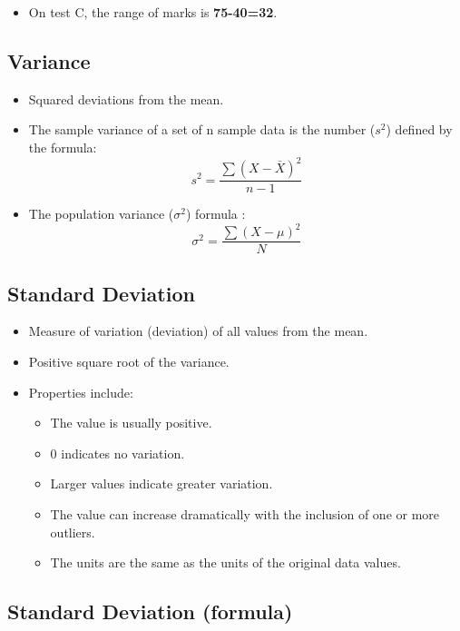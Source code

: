 \documentclass[]{article}
\providecommand{\tightlist}{%
  \setlength{\itemsep}{0pt}\setlength{\parskip}{0pt}}
\begin{document}
\begin{itemize}
\tightlist
\item
  On test C, the range of marks is \textbf{75-40=32}.
\end{itemize}

\hypertarget{variance}{%
\subsection{Variance}\label{variance}}

\begin{itemize}
\tightlist
\item
  Squared deviations from the mean.
\item
  The sample variance of a set of n sample data is the number (\(s^2\))
  defined by the formula: \[s^2=\frac{\sum(X-\bar{X})^2}{n-1}\]
\item
  The population variance (\(\sigma^2\)) formula :
  \[\sigma^2=\frac{\sum(X-\mu)^2}{N}\]
\end{itemize}

\hypertarget{standard-deviation}{%
\subsection{Standard Deviation}\label{standard-deviation}}

\begin{itemize}
\tightlist
\item
  Measure of variation (deviation) of all values from the mean.
\item
  Positive square root of the variance.
\item
  Properties include:

  \begin{itemize}
  \tightlist
  \item
    The value is usually positive.
  \item
    0 indicates no variation.
  \item
    Larger values indicate greater variation.
  \item
    The value can increase dramatically with the inclusion of one or
    more outliers.
  \item
    The units are the same as the units of the original data values.
  \end{itemize}
\end{itemize}

\hypertarget{standard-deviation-formula}{%
\subsection{Standard Deviation
(formula)}\label{standard-deviation-formula}}
\end{document}
